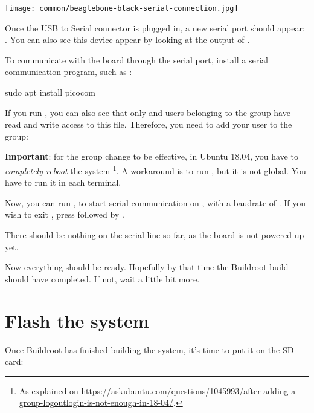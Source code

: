 \begin{center}
\texttt{[image: common/beaglebone-black-serial-connection.jpg]}
\end{center}

Once the USB to Serial connector is plugged in, a new serial port
should appear: .  You can also see this device
appear by looking at the output of .

To communicate with the board through the serial port, install a
serial communication program, such as :

\begin{bashinput}
sudo apt install picocom
\end{bashinput}

If you run , you can also see that only
 and users belonging to the  group have read
and write access to this file. Therefore, you need to add your user to
the  group:


{\bf Important}: for the group change to be effective, in Ubuntu 18.04, you have to
{\em completely reboot} the system \footnote{As explained on
\url{https://askubuntu.com/questions/1045993/after-adding-a-group-logoutlogin-is-not-enough-in-18-04/}.}.
A workaround is to run , but it is not global.
You have to run it in each terminal.

Now, you can run , to start
serial communication on , with a baudrate of
. If you wish to exit , press
\code{[Ctrl][a]} followed by \code{[Ctrl][x]}.

There should be nothing on the serial line so far, as the board is not
powered up yet.



Now everything should be ready. Hopefully by that time the Buildroot
build should have completed. If not, wait a little bit more.

\section{Flash the system}

Once Buildroot has finished building the system, it's time to put it
on the SD card:

